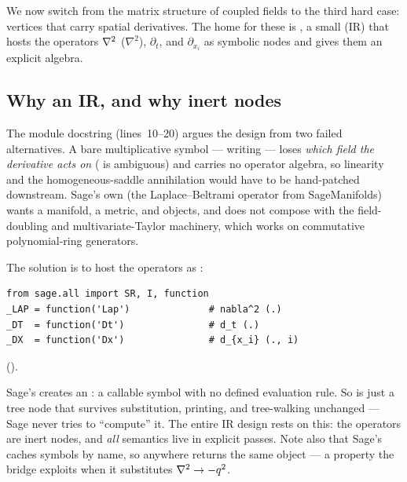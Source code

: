We now switch from the matrix structure of coupled fields to the third hard
case: vertices that carry spatial derivatives. The home for these is
, a small  (IR)
that hosts the operators $\nabla^2$ ($\nabla^{2}$), $\partial_{t}$, and
$\partial_{x_{i}}$ as symbolic nodes and gives them an explicit algebra.

\subsection{Why an IR, and why inert nodes}

The module docstring (lines~10--20) argues the design from two failed
alternatives. A bare multiplicative symbol --- writing
 --- loses \emph{which field the derivative acts on}
( is ambiguous) and carries no operator algebra, so
linearity and the homogeneous-saddle annihilation would have to be hand-patched
downstream. Sage's own  (the Laplace--Beltrami operator from
SageManifolds) wants a manifold, a metric, and  objects,
and does not compose with the \msrjd{} field-doubling and multivariate-Taylor
machinery, which works on commutative polynomial-ring generators.

The solution is to host the operators as :

\begin{lstlisting}
from sage.all import SR, I, function
_LAP = function('Lap')              # nabla^2 (.)
_DT  = function('Dt')               # d_t (.)
_DX  = function('Dx')               # d_{x_i} (., i)
\end{lstlisting}

().

\begin{defn}
Sage's  creates an : a
callable symbol with no defined evaluation rule. So  is just a
tree node  that survives substitution, printing, and tree-walking
unchanged --- Sage never tries to ``compute'' it. The entire IR design rests on
this: the operators are inert nodes, and \emph{all} semantics live in explicit
passes. Note also that Sage's   caches symbols by
name, so  anywhere returns the same object --- a
property the bridge exploits when it substitutes $\nabla^2\to-q^{2}$.
\end{defn}

